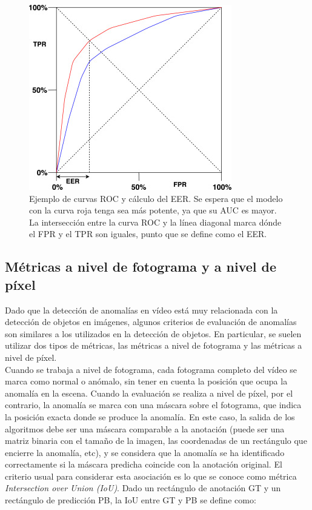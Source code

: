 \documentclass[../main.tex]{memoir}
\begin{document}
\begin{itemize}
  \begin{figure}[H]
    \centering
    \includegraphics[width=.38\textwidth]{images/roc-curve}
    \caption{Ejemplo de curvas ROC y cálculo del EER. Se espera que el
      modelo con la curva roja tenga sea más potente, ya que su AUC es
      mayor. La intersección entre la curva ROC y la línea diagonal
      marca dónde el FPR y el TPR son iguales, punto que se define
      como el EER.}
    \label{fig:roc-curve}
  \end{figure}
\end{itemize}

\subsection{Métricas a nivel de fotograma y a nivel de píxel}
\label{sec:frame-and-pixel-levels}

Dado que la detección de anomalías en vídeo está muy relacionada con
la detección de objetos en imágenes, algunos criterios de evaluación
de anomalías son similares a los utilizados en la detección de objetos.
En particular, se suelen utilizar dos tipos de métricas, las métricas
a nivel de fotograma y las métricas a nivel de píxel.\\

Cuando se trabaja a nivel de fotograma, cada fotograma completo del
vídeo se marca como normal o anómalo, sin tener en cuenta la posición
que ocupa la anomalía en la escena. Cuando la evaluación se realiza a
nivel de píxel, por el contrario, la anomalía se marca con una máscara
sobre el fotograma, que indica la posición exacta donde se produce la
anomalía. En este caso, la salida de los algoritmos debe ser una
máscara comparable a la anotación (puede ser una matriz binaria con el
tamaño de la imagen, las coordenadas de un rectángulo que encierre la
anomalía, etc), y se considera que la anomalía se ha identificado
correctamente si la máscara predicha coincide con la anotación
original. El criterio usual para considerar esta asociación es lo
que se conoce como métrica \textit{Intersection over Union (IoU)}.
Dado un rectángulo de anotación GT y un rectángulo de predicción PB,
la IoU entre GT y PB se define como:
\end{document}
